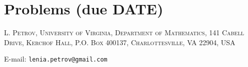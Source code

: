 \documentclass[letterpaper,11pt,oneside,reqno]{article}
\numberwithin{equation}{section}
\theoremstyle{definition}
\begin{document}
\appendix
\setcounter{section}{5}

\section{Problems (due DATE)}









\medskip

\textsc{L. Petrov, University of Virginia, Department of Mathematics, 141 Cabell Drive, Kerchof Hall, P.O. Box 400137, Charlottesville, VA 22904, USA}

E-mail: \texttt{lenia.petrov@gmail.com}
\end{document}
